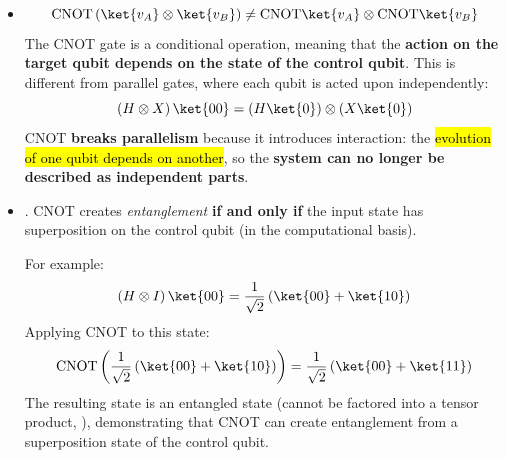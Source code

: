 \begin{itemize}
    \item {}
    \begin{equation*}
        \text{CNOT}\left(\ket{v_A} \otimes \ket{v_{B}}\right)
        \neq
        \text{CNOT}\ket{v_A} \otimes \text{CNOT}\ket{v_{B}}
    \end{equation*}
    The CNOT gate is a conditional operation, meaning that the \textbf{action on the target qubit depends on the state of the control qubit}. This is different from parallel gates, where each qubit is acted upon independently:
    \begin{equation*}
        \left(H \otimes X\right)\ket{00} = \left(H \ket{0} \right) \otimes \left( X \ket{0} \right)
    \end{equation*}
    CNOT \textbf{breaks parallelism} because it introduces interaction: the \hl{evolution of one qubit depends on another}, so the \textbf{system can no longer be described as independent parts}.
    
    \item {}. CNOT creates \emph{entanglement} \textbf{if and only if} the input state has superposition on the control qubit (in the computational basis).
    
    For example:
    \begin{equation*}
        \left(H \otimes I\right)\ket{00} = \frac{1}{\sqrt{2}} \left( \ket{00} + \ket{10} \right)
    \end{equation*}
    Applying CNOT to this state:
    \begin{equation*}
        \text{CNOT} \left( \frac{1}{\sqrt{2}} \left( \ket{00} + \ket{10} \right) \right) = \frac{1}{\sqrt{2}} \left( \ket{00} + \ket{11} \right)
    \end{equation*}
    The resulting state is an entangled state (cannot be factored into a tensor product, ), demonstrating that CNOT can create entanglement from a superposition state of the control qubit.
\end{itemize}


